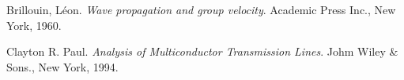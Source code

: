 \documentclass[../BTOF_summary.tex]{subfiles}
\begin{document}



\begin{thebibliography}{9}
Brillouin, Léon. 
\textit{Wave propagation and group velocity}. 
Academic Press Inc., New York, 1960.

Clayton R. Paul. 
\textit{Analysis of Multiconductor Transmission Lines}. 
Johm Wiley \& Sons., New York, 1994.

\end{thebibliography}
\end{document}
